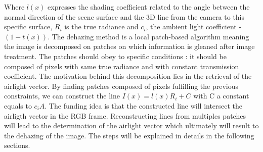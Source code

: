 \documentclass[conference]{IEEEtran}
\begin{document}
Where $l(x)$ expresses the shading coefficient related to the angle between the normal direction of the scene surface and 
the 3D line from the camera to this specific surface, $R_i$ is the true radiance and $c_i$, the ambient light coefficient - $(1-t(x))$.
The dehazing method is a local patch-based algorithm meaning the image is decomposed on patches on which information is
gleaned after image treatment.  The patches should obey to specific conditions : it should be composed of pixels with same
 true radiance and with constant transmission coefficient. The motivation behind this decomposition lies in the retrieval of the airlight
vector.  By finding patches composed of pixels fulfilling the previous constraints, we can construct the line $I(x) = l(x) R_i + C$ 
with C a constant equals to $c_i A$. The funding idea is that the constructed line will intersect the airligth vector in the RGB frame.
Reconstructing lines from multiples patches will lead to the determination of the airlight vector which ultimately will result to
the dehazing of the image.  The steps will be explained in details in the following sections.
\end{document}
